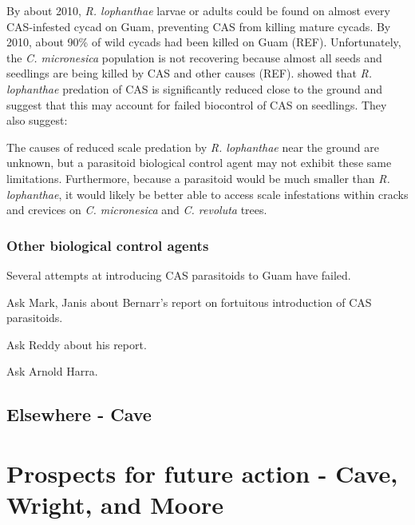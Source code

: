 \documentclass[12pt,letterpaper,english,bibliography=totocnumbered, abstract=on]{scrartcl}
\begin{document}
By about 2010, \textit{R. lophanthae} larvae or adults could be found on almost every CAS-infested cycad on Guam, preventing CAS from killing mature cycads. By 2010, about 90\% of wild cycads had been killed on Guam (REF). Unfortunately, the \textit{C. micronesica} population is not recovering because almost all seeds and seedlings are being killed by CAS and other causes (REF). \cite{marlerVerticalStratificationPredation2013} showed that \textit{R. lophanthae} predation of CAS is significantly reduced close to the ground and suggest that this may account for failed biocontrol of CAS on seedlings. They also suggest:
\begin{displayquote}
The causes of reduced scale predation by
\textit{R. lophanthae} near the ground are unknown,
but a parasitoid biological control agent may
not exhibit these same limitations. Furthermore, because a parasitoid would be much
smaller than \textit{R. lophanthae}, it would likely be
better able to access scale infestations within
cracks and crevices on \textit{C. micronesica} and
\textit{C. revoluta} trees.
\end{displayquote}

\subsubsection{Other biological control agents}  

Several attempts at introducing CAS parasitoids to Guam have failed.  
  

Ask Mark, Janis about Bernarr's report on fortuitous introduction of CAS parasitoids.

Ask Reddy about his report.

Ask Arnold Harra.


\subsection{Elsewhere - Cave}

\section{Prospects for future action - Cave, Wright, and Moore}

\newpage
\printbibliography[heading=bibintoc]
\end{document}
